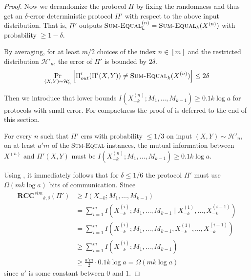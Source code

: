 \documentclass{toc}
\newcommand{\cond}{\;|\;}
\newcommand{\follows}{\ensuremath{\sim}}
\newcommand{\error}{\ensuremath{\delta}}
\newcommand{\bigomega}[1]{\ensuremath{{\Omega \left( {#1} \right)}}}
\newcommand{\rccsim}{\ensuremath{\mathbf{RCC}^{sim}}}
\newcommand{\sumequal}{\textsc{Sum-Equal} }
\begin{document}
\begin{proof}
	Now we derandomize the protocol $\Pi$ by fixing the randomness and thus get an $\error$-error deterministic protocol $\Pi'$ with respect to the above input distribution.
	That is, $\Pi'$ outputs $\sumequal_k^{(n)}=\sumequal_k(X^{(n)})$ with probability $\ge 1-\error$.

	By averaging, for at least $m/2$ choices of the index $n\in [m]$ and the restricted distribution $\mathcal{H}'_n$,
	the error of $\Pi'$ is bounded by $2\error$.
	\begin{align}
		\Pr_{(X,Y)\follows \mathcal{H}'_n}\left[ \Pi'_{out}(\Pi'(X,Y)) \ne \sumequal_k(X^{(n)}) \right] \le 
	2\error
	\end{align}

	Then we introduce  that 
	lower bounds $I\left(X^{(n)}_{-k}; M_1,\ldots, M_{k-1}\right)\ge 0.1{k\log a}$ for protocols with small error.
	For compactness the proof of  is deferred to the end of this section.

	\begin{lemma}\label{lemma: lb mutual information}
		For every $n$  such that $\Pi'$ errs with probability $\le 1/3$ on input  $(X,Y)\follows \mathcal{H}'_n$, on at least $a'm$ of the \sumequal instances,
		the mutual information between $X^{(n)}$ and $\Pi'(X,Y)$ must be
		$I\left(X^{(n)}_{-k}; M_1,\ldots, M_{k-1}\right)\ge 0.1{k\log a}$.
	\end{lemma}

	Using , it immediately follows that for $\error \le 1/6$ the protocol $\Pi'$ must use $\bigomega{mk\log a}$ bits of communication.
	Since
	\begin{align*}
	 	\rccsim_{k,\error}(\Pi') & \ge I\left(X_{-k}; M_1,\dots,M_{k-1} \right)\\
	 	& = \sum_{i=1}^m I\left(X^{(i)}_{-k}; M_1,\dots,M_{k-1}\cond X^{(1)}_{-k},\ldots,X^{(i-1)}_{-k} \right)\\
	 	& = \sum_{i=1}^m I\left(X^{(i)}_{-k}; M_1,\dots,M_{k-1}, X^{(1)}_{-k},\ldots,X^{(i-1)}_{-k} \right)\\
	 	& \ge \sum_{i=1}^m I\left(X^{(i)}_{-k}; M_1,\dots,M_{k-1} \right)\\
	 	& \ge \frac{a'm}{2}\cdot 0.1 k\log a =\bigomega{mk\log a}
	\end{align*} 
	since $a'$ is some constant between $0$ and $1$.
\end{proof}	
\end{document}
